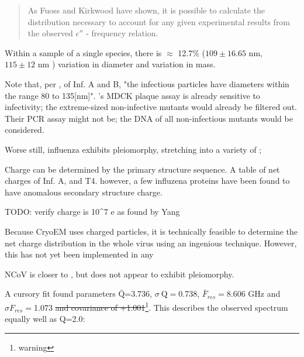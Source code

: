 \documentclass[paper.tex]{subfiles}
\begin{document}
\begin{quote}
	As Fuoss and Kirkwood have shown, it is possible to calculate the distribution necessary to account for any given experimental results from the observed $\epsilon''$ - frequency relation.
\end{quote}

Within a sample of a single species, there is $\approx$ 12.7\%  ($109 \pm 16.65 \text{ nm}$\cite{lauffer1944biophysical}, $115 \pm 12 \text{ nm}$ \cite{Characterization1984}) variation in diameter and  \cite{Characterization1984} variation in mass.



Note that, per \cite{lauffer1944biophysical}, of Inf. A and B, "the infectious particles have diameters within the range 80 to 135[nm]". \cite{Efficient2015}'s MDCK plaque assay is already sensitive to infectivity; the extreme-sized non-infective mutants would already be filtered out. Their PCR assay might not be; the DNA of all non-infectious mutants would be considered.


Worse still, influenza exhibits pleiomorphy, stretching into a variety of \cite{Influenza2006}; 

Charge can be determined by the primary structure sequence. A table of net charges of Inf. A, and T4. however, a few influzena proteins have been found to have anomalous secondary structure charge.

TODO: verify charge is 10^7 e as found by Yang

Because CryoEM uses charged particles, it is technically feasible to determine the net charge distribution in the whole virus using an ingenious \cite{Identification2018} technique. However, this has not yet been implemented in any


\footnotemark


NCoV is closer to \cite{Viral2020}, but does not appear to exhibit pleiomorphy.

A cursory fit found parameters $\bar{\text{Q}}$=3.736,  $\sigma \ \text{Q} = $0.738, $\bar{F}_{res}=$8.606 GHz and $\sigma {F_{res}}=$1.073 \st{and covariance of +1.001}\footnote{warning}. This describes the observed spectrum equally well as Q=2.0:
\end{document}
